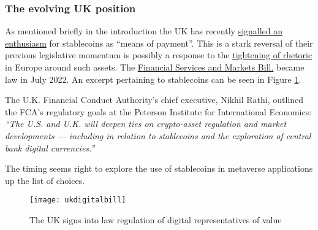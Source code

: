 

  




\subsubsection{The evolving UK position}
As mentioned briefly in the introduction the UK has recently \href{https://www.gov.uk/government/news/government-sets-out-plan-to-make-uk-a-global-cryptoasset-technology-hub}{signalled an enthusiasm} for stablecoins as ``means of payment''. This is a stark reversal of their previous legislative momentum is possibly a response to the \href{https://www.coindesk.com/policy/2022/05/11/eu-commission-favors-ban-on-large-scale-stablecoins-document-shows/}{tightening of rhetoric} in Europe around such assets. The \href{https://publications.parliament.uk/pa/bills/cbill/58-03/0146/220146.pdf}{Financial Services and Markets Bill.} became law in July 2022. An excerpt pertaining to stablecoins can be seen in Figure \ref{fig:ukdigitalbill}. \par
The U.K. Financial Conduct Authority’s chief executive, Nikhil Rathi, outlined the FCA’s regulatory goals at the Peterson Institute for International Economics: \textit{``The U.S. and U.K. will deepen ties on crypto-asset regulation and market developments — including in relation to stablecoins and the exploration of central bank digital currencies.''} \par
The timing seems right to explore the use of stablecoins in metaverse applications up the list of choices. 

\begin{figure}
  \centering
    \texttt{[image: ukdigitalbill]}
  \caption{The UK signs into law regulation of digital representatives of value}
  \label{fig:ukdigitalbill}
\end{figure}

